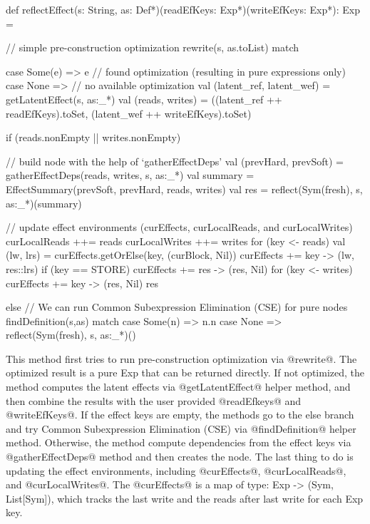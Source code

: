 \begin{listing}[scala]
def reflectEffect(s: String, as: Def*)(readEfKeys: Exp*)(writeEfKeys: Exp*): Exp = {
    // simple pre-construction optimization
    rewrite(s, as.toList) match {
      case Some(e) => e // found optimization (resulting in pure expressions only)
      case None => // no available optimization
        val (latent_ref, latent_wef) = getLatentEffect(s, as:_*)
        val (reads, writes) = ((latent_ref ++ readEfKeys).toSet, (latent_wef ++ writeEfKeys).toSet)

        if (reads.nonEmpty || writes.nonEmpty) {
            // build node with the help of `gatherEffectDeps'
            val (prevHard, prevSoft) = gatherEffectDeps(reads, writes, s, as:_*)
            val summary = EffectSummary(prevSoft, prevHard, reads, writes)
            val res = reflect(Sym(fresh), s, as:_*)(summary)

            // update effect environments (curEffects, curLocalReads, and curLocalWrites)
            curLocalReads ++= reads
            curLocalWrites ++= writes
            for (key <- reads) {
              val (lw, lrs) = curEffects.getOrElse(key, (curBlock, Nil))
              curEffects += key -> (lw, res::lrs)
              if (key == STORE) curEffects += res -> (res, Nil)
            }
            for (key <- writes) { curEffects += key -> (res, Nil) }
            res
        } else {
            // We can run Common Subexpression Elimination (CSE) for pure nodes
            findDefinition(s,as) match {
                case Some(n) => n.n
                case None =>
                reflect(Sym(fresh), s, as:_*)()
            }
        }
    }
}
\end{listing}

This method first tries to run pre-construction optimization via @rewrite@.
The optimized result is a pure Exp that can be returned directly. If not optimized,
the method computes the latent effects via @getLatentEffect@ helper method,
and then combine the results with the user provided @readEfkeys@ and @writeEfKeys@.
If the effect keys are empty, the methods go to the else branch and try Common
Subexpression Elimination (CSE) via @findDefinition@ helper method. Otherwise,
the method compute dependencies from the effect keys via @gatherEffectDeps@ method
and then creates the node. The last thing to do is updating the effect environments,
including @curEffects@, @curLocalReads@, and @curLocalWrites@. The @curEffects@ is
a map of type: Exp -> (Sym, List[Sym]), which tracks the last write and the reads
after last write for each Exp key.

